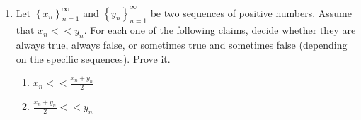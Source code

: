 \documentclass[12pt]{exam}
\newcommand {\DS} [1] {${\displaystyle #1}$}
\begin{document}
\begin{enumerate}
\newpage

\item Let \DS{\left\{x_n\right\}_{n=1}^{\infty}} and \DS{\left\{y_n\right\}_{n=1}^{\infty}} be two sequences of positive numbers.  Assume that \DS{x_n << y_n}. 
	For each one of the following claims, decide whether they are always true, always false, or sometimes true and sometimes false (depending on the specific sequences).  Prove it.
	\begin{enumerate}
		\item \DS{x_n << \frac{x_n+y_n}{2}}
		\item \DS{\frac{x_n+y_n}{2} << y_n}
	\end{enumerate}

\end{enumerate}
\end{document}
